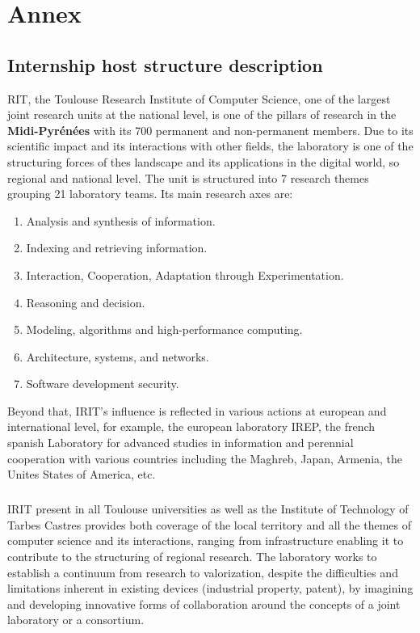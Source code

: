 %
%

\chapter{Annex}
\label{app:app01}

\section*{Internship host structure description}
RIT, the Toulouse Research Institute of Computer Science, one of the largest joint research units at the national level, is one of the pillars of research in the \textbf{Midi-Pyr\'{e}n\'{e}es} with its 700 permanent and non-permanent members. Due to its scientific impact and its interactions with other fields, the laboratory is one of the structuring forces of thes landscape and its applications in the digital world, so regional and national level. The unit is structured into 7 research themes grouping 21 laboratory teams. Its main research axes are:

\begin{enumerate}
    \item  Analysis and synthesis of information.
    \item  Indexing and retrieving information.
    \item  Interaction, Cooperation, Adaptation through Experimentation.
    \item  Reasoning and decision.
    \item  Modeling, algorithms and high-performance computing.
    \item  Architecture, systems, and networks.
    \item  Software development security.
\end{enumerate}


Beyond that, IRIT's influence is reflected in various actions at european and international level, for example, the european laboratory IREP, the french spanish Laboratory for advanced studies in information and perennial cooperation with various countries including the Maghreb, Japan, Armenia, the Unites States of America, etc.

\paragraph{} IRIT present in all Toulouse universities as well as the Institute of Technology of Tarbes Castres provides both coverage of the local territory and all the themes of computer science and its interactions, ranging from infrastructure enabling it to contribute to the structuring of regional research. The laboratory works to establish a continuum from research to valorization, despite the difficulties and limitations inherent in existing devices (industrial property, patent), by imagining and developing innovative forms of collaboration around the concepts of a joint laboratory or a consortium.


